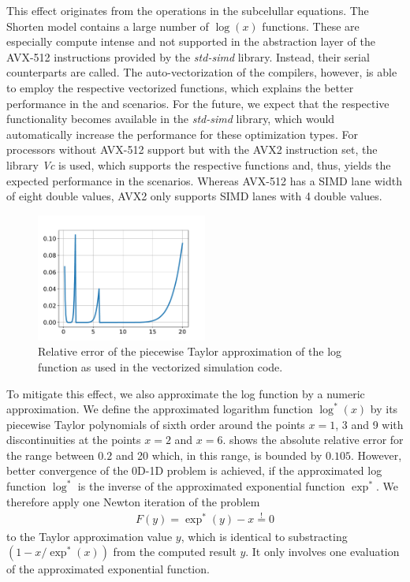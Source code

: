 This effect originates from the operations in the subcelullar equations. The Shorten model contains a large number of $\log(x)$ functions. These are especially compute intense and not supported in the abstraction layer of the AVX-512 instructions provided by the \emph{std-simd} library. Instead, their serial counterparts are called. The auto-vectorization of the compilers, however, is able to employ the respective vectorized functions, which explains the better performance in the  and  scenarios. For the future, we expect that the respective functionality becomes available in the \emph{std-simd} library, which would automatically increase the performance for these optimization types. For processors without AVX-512 support but with the AVX2 instruction set, the library \emph{Vc} is used, which supports the respective functions and, thus, yields the expected performance in the  scenarios. Whereas AVX-512 has a SIMD lane width of eight double values, AVX2 only supports SIMD lanes with 4 double values.

\begin{figure}
  \centering%
  \includegraphics[width=0.5\textwidth]{images/results/studies/apxlog.pdf}%
  \caption{Relative error of the piecewise Taylor approximation of the log function as used in the vectorized simulation code.}%
  \label{fig:apxlog}%
\end{figure}%
To mitigate this effect, we also approximate the log function by a numeric approximation. We define the approximated logarithm function $\log^\ast(x)$ by its piecewise Taylor polynomials of sixth order around the points $x=1$, 3 and 9 with discontinuities at the points $x=2$ and $x=6$.  shows the absolute relative error for the range between $0.2$ and 20 which, in this range, is bounded by $0.105$. However, better convergence of the 0D-1D problem is achieved, if the approximated log function $\log^\ast$ is the inverse of the approximated exponential function $\exp^\ast$. We therefore apply one Newton iteration of the problem %
\begin{align*}
  F(y) = \exp^\ast(y)-x \overset{!}{=} 0  
\end{align*}
%
to the Taylor approximation value $y$, which is identical to substracting $(1 - x/\exp^\ast(x))$ from the computed result $y$. It only involves one evaluation of the approximated exponential function.

